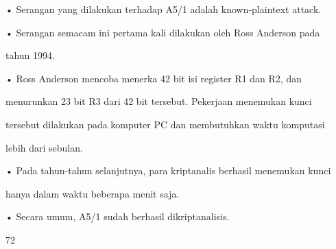 \documentclass{article}
\begin{document}

• Serangan yang dilakukan terhadap A5/1 adalah known-plaintext attack. 

• Serangan semacam ini pertama kali dilakukan oleh Ross Anderson pada 

tahun 1994. 

• Ross Anderson mencoba menerka 42 bit isi register R1 dan R2, dan 

menurunkan 23 bit R3 dari 42 bit tersebut.  Pekerjaan menemukan kunci 

tersebut dilakukan pada komputer PC dan membutuhkan waktu komputasi 

lebih dari sebulan. 

• Pada tahun-tahun selanjutnya, para kriptanalis berhasil menemukan kunci 

hanya dalam waktu beberapa menit saja. 

• Secara umum, A5/1 sudah berhasil dikriptanalisis.

72
\end{document}

